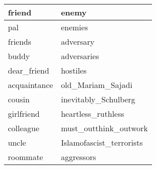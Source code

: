 \begin{tabular}{ll}
\toprule
       friend &                     enemy \\
\midrule
          pal &                   enemies \\
      friends &                 adversary \\
        buddy &               adversaries \\
  dear\_friend &                  hostiles \\
 acquaintance &         old\_Mariam\_Sajadi \\
       cousin &      inevitably\_Schulberg \\
   girlfriend &        heartless\_ruthless \\
    colleague &     must\_outthink\_outwork \\
        uncle &  Islamofascist\_terrorists \\
     roommate &                aggressors \\
\bottomrule
\end{tabular}

